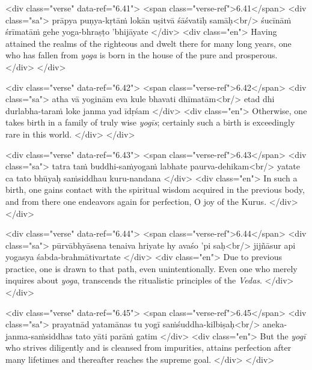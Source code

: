 \begin{html}
<div class="verse" data-ref="6.41">
  <span class="verse-ref">6.41</span>
  <div class="sa">
    prāpya puṇya-kṛtāṁ lokān uṣitvā śāśvatīḥ samāḥ<br/>
    śucīnāṁ śrīmatāṁ gehe yoga-bhraṣṭo ’bhijāyate
  </div>
  <div class="en">
    Having attained the realms of the righteous and dwelt there for many long years, one who has fallen from \textit{yoga} is born in the house of the pure and prosperous.
  </div>
</div>
\end{html}



\begin{html}
<div class="verse" data-ref="6.42">
  <span class="verse-ref">6.42</span>
  <div class="sa">
    atha vā yoginām eva kule bhavati dhīmatām<br/>
    etad dhi durlabha-taraṁ loke janma yad īdṛśam
  </div>
  <div class="en">
    Otherwise, one takes birth in a family of truly wise \textit{yogīs}; certainly such a birth is exceedingly rare in this world.
  </div>
</div>
\end{html}



\begin{html}
<div class="verse" data-ref="6.43">
  <span class="verse-ref">6.43</span>
  <div class="sa">
    tatra taṁ buddhi-saṁyogaṁ labhate paurva-dehikam<br/>
    yatate ca tato bhūyaḥ saṁsiddhau kuru-nandana
  </div>
  <div class="en">
    In such a birth, one gains contact with the spiritual wisdom acquired in the previous body, and from there one endeavors again for perfection, O joy of the Kurus.
  </div>
</div>
\end{html}



\begin{html}
<div class="verse" data-ref="6.44">
  <span class="verse-ref">6.44</span>
  <div class="sa">
    pūrvābhyāsena tenaiva hriyate hy avaśo ’pi saḥ<br/>
    jijñāsur api yogasya śabda-brahmātivartate
  </div>
  <div class="en">
    Due to previous practice, one is drawn to that path, even unintentionally. Even one who merely inquires about \textit{yoga}, transcends the ritualistic principles of the \textit{Vedas}.
  </div>
</div>
\end{html}



\begin{html}
<div class="verse" data-ref="6.45">
  <span class="verse-ref">6.45</span>
  <div class="sa">
    prayatnād yatamānas tu yogī saṁśuddha-kilbiṣaḥ<br/>
    aneka-janma-saṁsiddhas tato yāti parāṁ gatim
  </div>
  <div class="en">
    But the \textit{yogī} who strives diligently and is cleansed from impurities, attains perfection after many lifetimes and thereafter reaches the supreme goal.
  </div>
</div>
\end{html}



